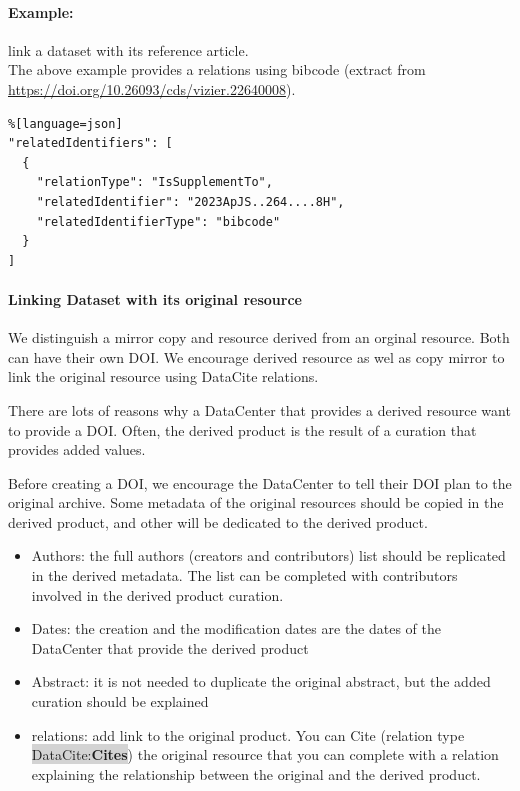 \documentclass[11pt,a4paper]{ivoa}
\newcommand{\dataciteterm}[1]{\colorbox{lightgray}{DataCite:\textbf{#1}}}
\begin{document}
\paragraph{Example:} link a dataset with its reference article.\\
The above example provides a relations using bibcode (extract from \url{https://doi.org/10.26093/cds/vizier.22640008}).

\begin{lstlisting}%[language=json]
"relatedIdentifiers": [
  {
    "relationType": "IsSupplementTo",
    "relatedIdentifier": "2023ApJS..264....8H",
    "relatedIdentifierType": "bibcode"
  }
]
\end{lstlisting}

\paragraph{Linking Dataset with its original resource}
We distinguish a mirror copy and resource derived from an orginal resource.
Both can have their own DOI. We encourage derived resource as wel as copy mirror to link the original resource using DataCite relations.

There are lots of reasons why a DataCenter that provides a derived resource want to provide a DOI. 
Often, the derived product is the result of a curation that provides added values.

Before creating a DOI, we encourage the DataCenter to tell their DOI plan to the original archive.
Some metadata of the original resources should be copied in the derived product, and other will be dedicated to the derived product.

\begin{itemize}
\item Authors: the full authors (creators and contributors) list should be replicated in the derived metadata. The list can be completed with contributors involved in the derived product curation.
\item Dates: the creation and the modification dates are the dates of the DataCenter that provide the derived product
\item Abstract: it is not needed to duplicate the original abstract, but the added curation should be explained
\item relations: add link to the original product. 
You can Cite (relation type \dataciteterm{Cites}) the original resource that you can complete with a relation explaining the relationship between the original and the derived product.
\end{itemize}
\end{document}
